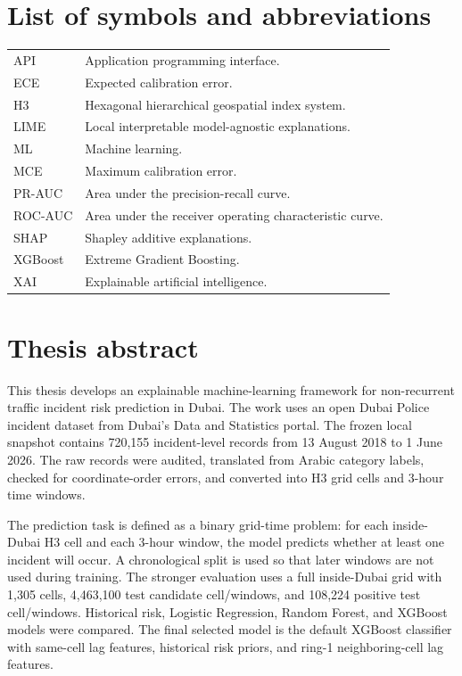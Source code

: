\documentclass[12pt,a4paper]{report}
\begin{document}
\chapter*{List of symbols and abbreviations}
\begin{longtable}{L{0.24\textwidth}L{0.68\textwidth}}
API & Application programming interface. \\
ECE & Expected calibration error. \\
H3 & Hexagonal hierarchical geospatial index system. \\
LIME & Local interpretable model-agnostic explanations. \\
ML & Machine learning. \\
MCE & Maximum calibration error. \\
PR-AUC & Area under the precision-recall curve. \\
ROC-AUC & Area under the receiver operating characteristic curve. \\
SHAP & Shapley additive explanations. \\
XGBoost & Extreme Gradient Boosting. \\
XAI & Explainable artificial intelligence. \\
\end{longtable}

\chapter*{Thesis abstract}
This thesis develops an explainable machine-learning framework for non-recurrent traffic incident risk prediction in Dubai. The work uses an open Dubai Police incident dataset from Dubai's Data and Statistics portal. The frozen local snapshot contains 720,155 incident-level records from 13 August 2018 to 1 June 2026. The raw records were audited, translated from Arabic category labels, checked for coordinate-order errors, and converted into H3 grid cells and 3-hour time windows.

The prediction task is defined as a binary grid-time problem: for each inside-Dubai H3 cell and each 3-hour window, the model predicts whether at least one incident will occur. A chronological split is used so that later windows are not used during training. The stronger evaluation uses a full inside-Dubai grid with 1,305 cells, 4,463,100 test candidate cell/windows, and 108,224 positive test cell/windows. Historical risk, Logistic Regression, Random Forest, and XGBoost models were compared. The final selected model is the default XGBoost classifier with same-cell lag features, historical risk priors, and ring-1 neighboring-cell lag features.
\end{document}
